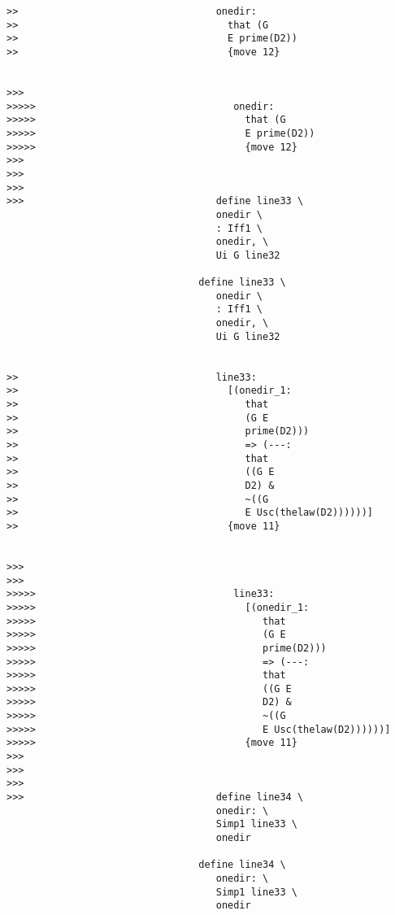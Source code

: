 \documentclass[12pt]{article}
\begin{document}
\begin{verbatim}
>>                                  onedir:
>>                                    that (G
>>                                    E prime(D2))
>>                                    {move 12}


>>>
>>>>>                                  onedir:
>>>>>                                    that (G
>>>>>                                    E prime(D2))
>>>>>                                    {move 12}
>>>
>>>
>>>
>>>                                 define line33 \
                                    onedir \
                                    : Iff1 \
                                    onedir, \
                                    Ui G line32

                                 define line33 \
                                    onedir \
                                    : Iff1 \
                                    onedir, \
                                    Ui G line32


>>                                  line33:
>>                                    [(onedir_1:
>>                                       that
>>                                       (G E
>>                                       prime(D2)))
>>                                       => (---:
>>                                       that
>>                                       ((G E
>>                                       D2) &
>>                                       ~((G
>>                                       E Usc(thelaw(D2))))))]
>>                                    {move 11}


>>>
>>>
>>>>>                                  line33:
>>>>>                                    [(onedir_1:
>>>>>                                       that
>>>>>                                       (G E
>>>>>                                       prime(D2)))
>>>>>                                       => (---:
>>>>>                                       that
>>>>>                                       ((G E
>>>>>                                       D2) &
>>>>>                                       ~((G
>>>>>                                       E Usc(thelaw(D2))))))]
>>>>>                                    {move 11}
>>>
>>>
>>>
>>>                                 define line34 \
                                    onedir: \
                                    Simp1 line33 \
                                    onedir

                                 define line34 \
                                    onedir: \
                                    Simp1 line33 \
                                    onedir



\end{verbatim}
\end{document}
